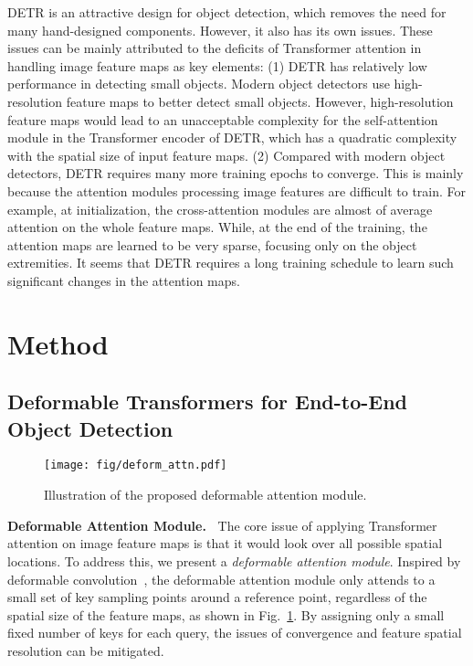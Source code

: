 \documentclass{article}
\begin{document}
DETR is an attractive design for object detection, which removes the need for many hand-designed components. However, it also has its own issues. These issues can be mainly attributed to the deficits of Transformer attention in handling image feature maps as key elements:
(1) DETR has relatively low performance in detecting small objects. Modern object detectors use high-resolution feature maps to better detect small objects. However, high-resolution feature maps would lead to an unacceptable complexity for the self-attention module in the Transformer encoder of DETR, which has a quadratic complexity with the spatial size of input feature maps.
(2) Compared with modern object detectors, DETR requires many more training epochs to converge. This is mainly because the attention modules processing image features are difficult to train. For example, at initialization, the cross-attention modules are almost of average attention on the whole feature maps.
While, at the end of the training, the attention maps are learned to be very sparse, focusing only on the object extremities.
It seems that DETR requires a long training schedule to learn such significant changes in the attention maps.





\section{Method}

\subsection{Deformable Transformers for End-to-End Object Detection}
\label{sec:deform_attn}

\begin{figure}[t]
\begin{center}
  \texttt{[image: fig/deform\_attn.pdf]}
\end{center}
\vspace{-0.5em}
\caption{Illustration of the proposed deformable attention module.}
\vspace{-0.5em}
\label{fig:deform_attn}
\end{figure}

\textbf{Deformable Attention Module.~} The core issue of applying Transformer attention on image feature maps is that it would look over all possible spatial locations. To address this, we present a \emph{deformable attention module}.
Inspired by deformable convolution~\citep{dai2017deformable,zhu2019deformable}, the deformable attention module only attends to a small set of key sampling points around a reference point, regardless of the spatial size of the feature maps, as shown in Fig.~\ref{fig:deform_attn}.
By assigning only a small fixed number of keys for each query, the issues of convergence and feature spatial resolution can be mitigated.
\end{document}

